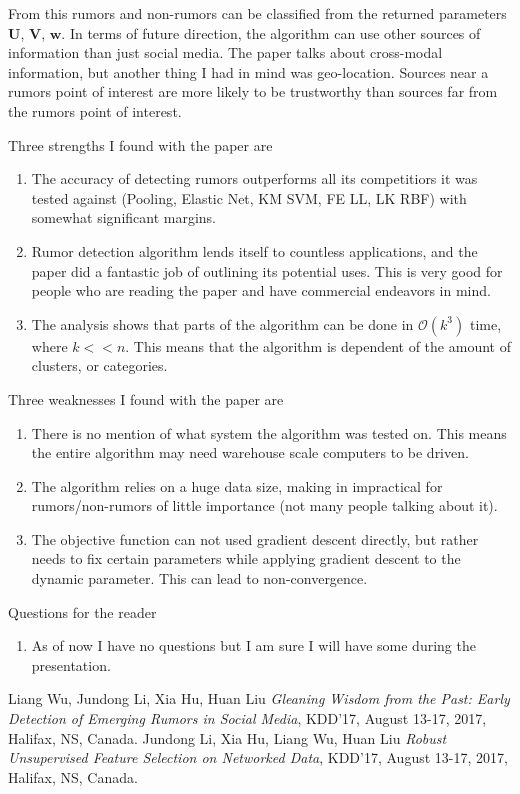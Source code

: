 \documentclass[12pt]{article}
\theoremstyle{remark}
\begin{document}
	From this rumors and non-rumors can be classified from the returned parameters $\boldsymbol{U}$, $\boldsymbol{V}$, $\boldsymbol{w}$. In terms of future direction, the algorithm can use other sources of information than just social media. The paper talks about cross-modal information, but another thing I had in mind was geo-location. Sources near a rumors point of interest are more likely to be trustworthy than sources far from the rumors point of interest. 
	
	\newpage
	
	Three strengths I found with the paper are
	\begin{enumerate}
		\item The accuracy of detecting rumors outperforms all its competitiors it was tested against (Pooling, Elastic Net, KM SVM, FE LL, LK RBF) with somewhat significant margins.
		\item Rumor detection algorithm lends itself to countless applications, and the paper did a fantastic job of outlining its potential uses. This is very good for people who are reading the paper and have commercial endeavors in mind.
		\item The analysis shows that parts of the algorithm can be done in $\mathcal{O}(k^3)$ time, where $k << n$. This means that the algorithm is dependent of the amount of clusters, or categories.
	\end{enumerate} 
	\vspace{0.5cm}
	
	Three weaknesses I found with the paper are
	\begin{enumerate}
		\item There is no mention of what system the algorithm was tested on. This means the entire algorithm may need warehouse scale computers to be driven.
		\item The algorithm relies on a huge data size, making in impractical for rumors/non-rumors of little importance (not many people talking about it).
		\item The objective function can not used gradient descent directly, but rather needs to fix certain parameters while applying gradient descent to the dynamic parameter. This can lead to non-convergence. 
	\end{enumerate}
	\vspace{0.5cm}
	
	Questions for the reader
	\begin{enumerate}
		\item As of now I have no questions but I am sure I will have some during the presentation. 
	\end{enumerate}
	\vspace{0.5cm}
	
	\begin{thebibliography}{unsrt}
		Liang Wu, Jundong Li, Xia Hu, Huan Liu \emph{Gleaning Wisdom from the Past: Early Detection of Emerging Rumors in Social Media}, KDD’17, August 13-17, 2017, Halifax, NS, Canada.
		Jundong Li, Xia Hu, Liang Wu, Huan Liu \emph{Robust Unsupervised Feature Selection on Networked Data}, KDD’17, August 13-17, 2017, Halifax, NS, Canada.
	\end{thebibliography}
	
\end{document}

